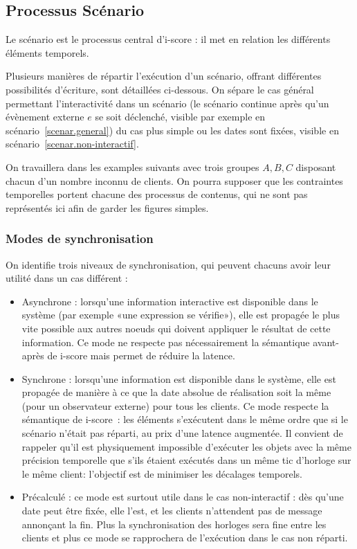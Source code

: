 \documentclass{article}
\begin{document}
\subsection{Processus Scénario}
Le scénario est le processus central d'i-score : il met en relation les différents éléments temporels.

Plusieurs manières de répartir l'exécution d'un scénario, offrant différentes possibilités d'écriture, sont détaillées ci-dessous. On sépare le cas général permettant l'interactivité dans un scénario (le scénario continue après qu'un évènement externe $e$ se soit déclenché, visible par exemple en scénario~\ref{scenar.general}) du cas plus simple ou les dates sont fixées, visible en scénario~\ref{scenar.non-interactif}.

On travaillera dans les examples suivants avec trois groupes $A,B,C$ disposant chacun d'un nombre inconnu de clients. 
On pourra supposer que les contraintes temporelles portent chacune des processus de contenus, qui ne sont pas représentés ici afin de garder les figures simples.

\subsubsection{Modes de synchronisation}
On identifie trois niveaux de synchronisation, qui peuvent chacuns avoir leur utilité dans un cas différent : 
\begin{itemize}
    \item Asynchrone : lorsqu'une information interactive est disponible dans le système (par exemple «une expression se vérifie»), elle est propagée le plus vite possible aux autres noeuds qui doivent appliquer le résultat de cette information. Ce mode ne respecte pas nécessairement la sémantique avant-après de i-score mais permet de réduire la latence.
    \item Synchrone : lorsqu'une information est disponible dans le système, elle est propagée de manière à ce que la date absolue de réalisation soit  la même (pour un observateur externe) pour tous les clients. 
    Ce mode respecte la sémantique de i-score~: les éléments s'exécutent dans le même ordre que si le scénario n'était pas réparti, au prix d'une latence augmentée.    
    Il convient de rappeler qu'il est physiquement impossible d'exécuter les objets avec la même précision temporelle que s'ils étaient exécutés dans un même tic d'horloge sur le même client: l'objectif est de minimiser les décalages temporels.
    \item Précalculé : ce mode est surtout utile dans le cas non-interactif : dès qu'une date peut être fixée, elle l'est, et les clients n'attendent pas de message annonçant la fin. 
    Plus la synchronisation des horloges sera fine entre les clients et plus ce mode se rapprochera de l'exécution dans le cas non réparti.
\end{itemize}
\end{document}
